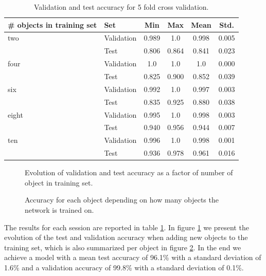 \begin{table}
	\centering
	\begin{tabular}{l | l | c | c | c | c}
		\hline
		\# objects in training set & Set & Min & Max & Mean & Std. \\ \hline

		two
		& Validation & 0.989 & 1.0   & 0.998 & 0.005 \\
		& Test       & 0.806 & 0.864 & 0.841 & 0.023 \\ \hline

		four
		& Validation & 1.0   & 1.0   & 1.0   & 0.000 \\
		& Test       & 0.825 & 0.900 & 0.852 & 0.039 \\ \hline

		six
		& Validation & 0.992 & 1.0   & 0.997 & 0.003 \\
		& Test       & 0.835 & 0.925 & 0.880 & 0.038 \\ \hline

		eight
		& Validation & 0.995 & 1.0   & 0.998 & 0.003 \\
		& Test       & 0.940 & 0.956 & 0.944 & 0.007 \\ \hline

		ten
		& Validation & 0.996 & 1.0   & 0.998 & 0.001 \\
		& Test       & 0.936 & 0.978 & 0.961 & 0.016 \\ \hline
	\end{tabular}
	\caption{Validation and test accuracy for 5 fold cross validation.}
	\label{tab:results_perobj}
\end{table}

\begin{figure}
	
	\caption{Evolution of validation and test accuracy as a factor of number of object in training set.}
	\label{fig:object_impact}
\end{figure}

\begin{figure}
	
	\caption{Accuracy for each object depending on how many objects the network is trained on.}
	\label{fig:object_impact_heatmap}
\end{figure}

The results for each session are reported in table \ref{tab:results_perobj}. In figure \ref{fig:object_impact} we present the evolution of the test and validation accuracy when adding new objects to the training set, which is also summarized per object in figure \ref{fig:object_impact_heatmap}. In the end we achieve a model with a mean test accuracy of 96.1\% with a standard deviation of 1.6\% and a validation accuracy of 99.8\% with a standard deviation of 0.1\%.

